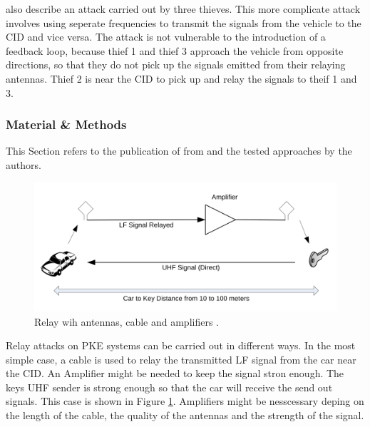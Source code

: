 	\label{par:threeThieves}
	\citeauthor{someAttacksPKES} also describe an attack carried out by three thieves.
	This more complicate attack involves using seperate frequencies to transmit the signals
	from the vehicle to the CID and vice versa.
	The attack is not vulnerable to the introduction of a feedback loop,
	because thief 1 and thief 3 approach the vehicle from opposite directions,
	so that they do not pick up the signals emitted from their relaying antennas.
	Thief 2 is near the CID to pick up and relay the signals to theif 1 and 3.

\subsubsection*{Material \& Methods}
	\label{sec:matmet}
	This Section refers to the publication of \citeauthor{relayAttacksFranc} from \citeyear{relayAttacksFranc}
	and the tested approaches by the authors.

	\begin{figure}[htb]
		\begin{center}
			\includegraphics[width=\textwidth]{pictures/franc_relay_over_the_wire.png}
		\end{center}
		\caption{Relay wih antennas, cable and amplifiers \citep[p. 5]{relayAttacksFranc}.}
		\label{fig:relayOTW}
	\end{figure}

	Relay  attacks on PKE systems can be carried out in different ways.
	In the most simple case,
	a cable is used to relay the transmitted LF signal from the car near the CID.
	An Amplifier might be needed to keep the signal stron enough.
	The keys UHF sender is strong enough so that the car will receive the send out signals.
	This case is shown in Figure \ref{fig:relayOTW}.
	Amplifiers might be nesscessary deping on the length of the cable,
	the quality of the antennas and the strength of the signal.

